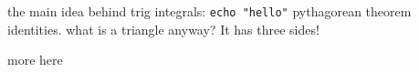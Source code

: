 the main idea behind trig integrals:
\texttt{echo "hello"}
pythagorean theorem identities.
what is a triangle anyway?
It has three sides!

more here
